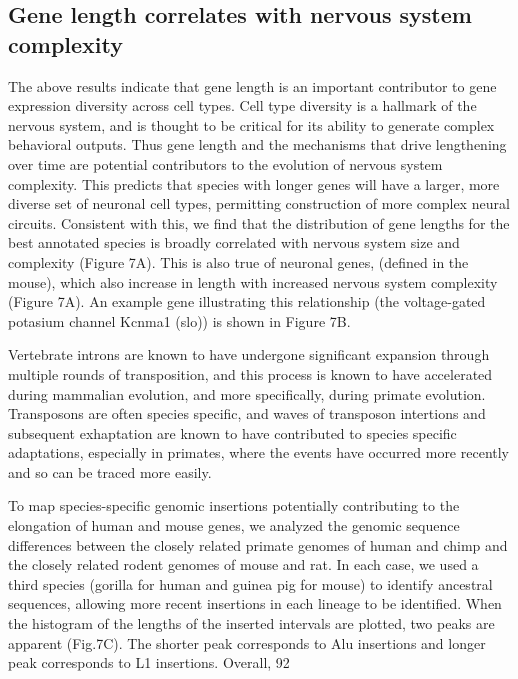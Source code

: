 \subsection{Gene length correlates with nervous system complexity}

The above results indicate that gene length is an important contributor to gene expression diversity across cell types. Cell type diversity is a hallmark of the nervous system, and is thought to be critical for its ability to generate complex behavioral outputs. Thus gene length and the mechanisms that drive lengthening over time are potential contributors to the evolution of nervous system complexity. This predicts that species with longer genes will have a larger, more diverse set of neuronal cell types, permitting construction of more complex neural circuits. Consistent with this, we find that the distribution of gene lengths for the best annotated species is broadly correlated with nervous system size and complexity (Figure 7A). This is also true of neuronal genes, (defined in the mouse), which also increase in length with increased nervous system complexity (Figure 7A). An example gene illustrating this relationship (the voltage-gated potasium channel Kcnma1 (slo)) is shown in Figure 7B. 

Vertebrate introns are known to have undergone significant expansion through multiple rounds of transposition, and this process is known to have accelerated during mammalian evolution, and more specifically, during primate evolution\cite{Friedli_2015}. Transposons are often species specific, and waves of transposon intertions and subsequent exhaptation are known to have contributed to species specific adaptations\cite{Villar_2015}\cite{Mita_2016}\cite{Imbeault_2017}\cite{Chuong_2016a}, especially in primates\cite{Ward_2013}, where the events have occurred more recently and so can be traced more easily. 

To map species-specific genomic insertions potentially contributing to the elongation of human and mouse genes, we analyzed the genomic sequence differences between the closely related primate genomes of human and chimp and the closely related rodent genomes of mouse and rat. In each case, we used a third species (gorilla for human and guinea pig for mouse) to identify ancestral sequences, allowing more recent insertions in each lineage to be identified. When the histogram of the lengths of the inserted intervals are plotted, two peaks are apparent (Fig.7C). The shorter peak corresponds to Alu insertions and longer peak corresponds to L1 insertions. Overall, 92%

